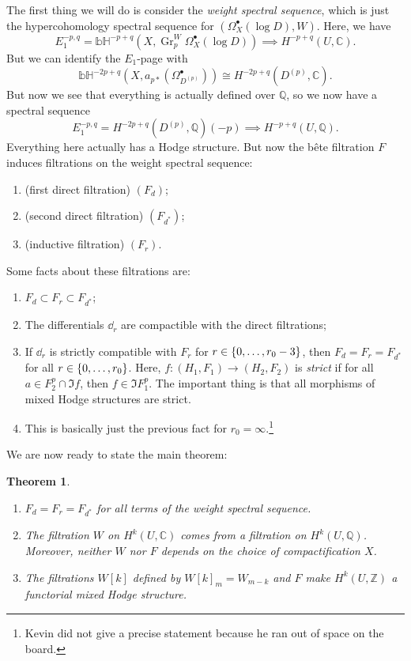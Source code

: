 \documentclass[leqno, openany]{memoir}
\newtheorem{thm}{Theorem}[section]
\theoremstyle{definition}
\theoremstyle{remark}
\theoremstyle{plain}
\theoremstyle{definition}
\theoremstyle{remark}
\newcommand{\bH}{\mathbb{bH}}
\newcommand{\C}{\mathbb{C}}
\newcommand{\Z}{\mathbb{Z}}
\newcommand{\Q}{\mathbb{Q}}
\newcommand{\on}[1]{\operatorname{#1}}
\begin{document}
The first thing we will do is consider the \textit{weight spectral sequence}, which is just the hypercohomology spectral sequence for $(\Omega_X^{\bullet}(\log D), W)$. Here, we have
\[ E_1^{-p,q} = \bH^{-p+q}(X, \on{Gr}_p^W \Omega_X^{\bullet}(\log D)) \implies H^{-p+q}(U, \C). \]
But we can identify the $E_1$-page with
\[ \bH^{-2p+q}(X, a_{p*}(\Omega^{\bullet}_{D^{(p)}})) \cong H^{-2p+q}(D^{(p)}, \C). \]
But now we see that everything is actually defined over $\Q$, so we now have a spectral sequence
\[ E_1^{-p,q} = H^{-2p+q}(D^{(p)}, \Q)(-p) \implies H^{-p+q}(U, \Q). \]
Everything here actually has a Hodge structure. But now the b\^ete filtration $F$ induces filtrations on the weight spectral sequence:
\begin{enumerate}
    \item (first direct filtration) $(F_d)$;
    \item (second direct filtration) $(F_{d^*})$;
    \item (inductive filtration) $(F_r)$.
\end{enumerate}
Some facts about these filtrations are:
\begin{enumerate}
    \item $F_d \subset F_r \subset F_{d^*}$;
    \item The differentials $\dd_r$ are compactible with the direct filtrations;
    \item If $\dd_r$ is strictly compatible with $F_r$ for $r \in \qty{0, \ldots, r_0 - 3}$, then $F_d = F_r = F_{d^*}$ for all $r \in \qty{0, \ldots, r_0}$. Here, $f \colon (H_1, F_1) \to (H_2, F_2)$ is \textit{strict} if for all $a \in F_2^p \cap \Im f$, then $f \in \Im F_1^p$. The important thing is that all morphisms of mixed Hodge structures are strict.
    \item This is basically just the previous fact for $r_0 = \infty$.\footnote{Kevin did not give a precise statement because he ran out of space on the board.}
\end{enumerate}

We are now ready to state the main theorem:
\begin{thm}\leavevmode
    \begin{enumerate}
        \item $F_d = F_r = F_{d^*}$ for all terms of the weight spectral sequence.
        \item The filtration $W$ on $H^k(U, \C)$ comes from a filtration on $H^k(U, \Q)$. Moreover, neither $W$ nor $F$ depends on the choice of compactification $X$.
        \item The filtrations $W[k]$ defined by $W[k]_m = W_{m-k}$ and $F$ make $H^k(U, \Z)$ a functorial mixed Hodge structure.
    \end{enumerate}
\end{thm}
\end{document}
